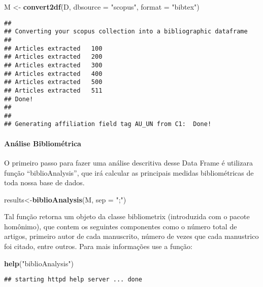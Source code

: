 \documentclass[]{article}
\newenvironment{Shaded}{\begin{snugshade}}{\end{snugshade}}
\newcommand{\DataTypeTok}[1]{\textcolor[rgb]{0.13,0.29,0.53}{#1}}
\newcommand{\KeywordTok}[1]{\textcolor[rgb]{0.13,0.29,0.53}{\textbf{#1}}}
\newcommand{\NormalTok}[1]{#1}
\newcommand{\StringTok}[1]{\textcolor[rgb]{0.31,0.60,0.02}{#1}}
\let\oldparagraph\paragraph
\renewcommand{\paragraph}[1]{\oldparagraph{#1}\mbox{}}
\begin{document}
\begin{Shaded}
\begin{Highlighting}[]
\NormalTok{M <-}\StringTok{ }\KeywordTok{convert2df}\NormalTok{(D, }\DataTypeTok{dbsource =} \StringTok{"scopus"}\NormalTok{, }\DataTypeTok{format =} \StringTok{"bibtex"}\NormalTok{)}
\end{Highlighting}
\end{Shaded}

\begin{verbatim}
## 
## Converting your scopus collection into a bibliographic dataframe
## 
## Articles extracted   100 
## Articles extracted   200 
## Articles extracted   300 
## Articles extracted   400 
## Articles extracted   500 
## Articles extracted   511 
## Done!
## 
## 
## Generating affiliation field tag AU_UN from C1:  Done!
\end{verbatim}

\hypertarget{analise-bibliometrica}{%
\paragraph{Análise Bibliométrica}\label{analise-bibliometrica}}

O primeiro passo para fazer uma análise descritiva desse Data Frame é
utilizara função ``biblioAnalysis'', que irá calcular as principais
medidas bibliométricas de toda nossa base de dados.

\begin{Shaded}
\begin{Highlighting}[]
\NormalTok{results<-}\KeywordTok{biblioAnalysis}\NormalTok{(M, }\DataTypeTok{sep =} \StringTok{";"}\NormalTok{)}
\end{Highlighting}
\end{Shaded}

Tal função retorna um objeto da classe bibliometrix (introduzida com o
pacote homônimo), que contem os seguintes componentes como o número
total de artigos, primeiro autor de cada manuscrito, número de vezes que
cada manustrico foi citado, entre outros. Para mais informações use a
função:

\begin{Shaded}
\begin{Highlighting}[]
\KeywordTok{help}\NormalTok{(}\StringTok{"biblioAnalysis"}\NormalTok{)}
\end{Highlighting}
\end{Shaded}

\begin{verbatim}
## starting httpd help server ... done
\end{verbatim}
\end{document}
